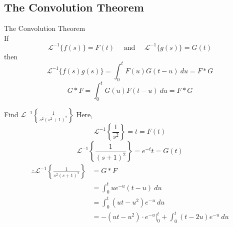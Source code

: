 \documentclass[12pt]{article}
\newcommand{\Lapinv}{\mathscr{L}^{-1}}
\begin{document}
\subsection{The Convolution Theorem}

\begin{theorem}{The Convolution Theorem}{}
    \\If \[
        \Lapinv \{ f(s) \} = F(t) \quad \text{ and } \quad \Lapinv \{ g(s) \} = G(t)
    \] then \[
        \Lapinv \{ f(s)g(s) \} = \int_{0}^{t} {F(u)G(t-u)} \: d{u} = F * G
    \] \[
        G*F = \int_{0}^{t} {G(u)F(t-u)} \: d{u} = F*G
    \]
\end{theorem}

\begin{example}{Find $\displaystyle \Lapinv \left\{ \frac{1}{s^2(s^2+1)^2} \right\}$}{}
    Here, \[
        \Lapinv \left\{ \frac{1}{s^2} \right\} = t = F(t)
    \] \[
        \Lapinv \left\{ \frac{1}{(s+1)^2} \right\} = e^{-t}t = G(t)
    \]
    \begin{align*}
        \therefore \Lapinv \left\{ \frac{1}{s^2(s+1)^2} \right\} &= G*F \\
        &= \int_{0}^{t} {ue^{-u} (t-u)} \: d{u} \\
        &= \int_{0}^{t} {(ut - u^2)e^{-u}} \: d{u}  \\
        &= -(ut-u^2) \cdot e^{-u} \bigg|_{0}^{t} + \int_{0}^{t} {(t - 2u)e^{-u}} \: d{u}
    \end{align*}
\end{example}
\end{document}
